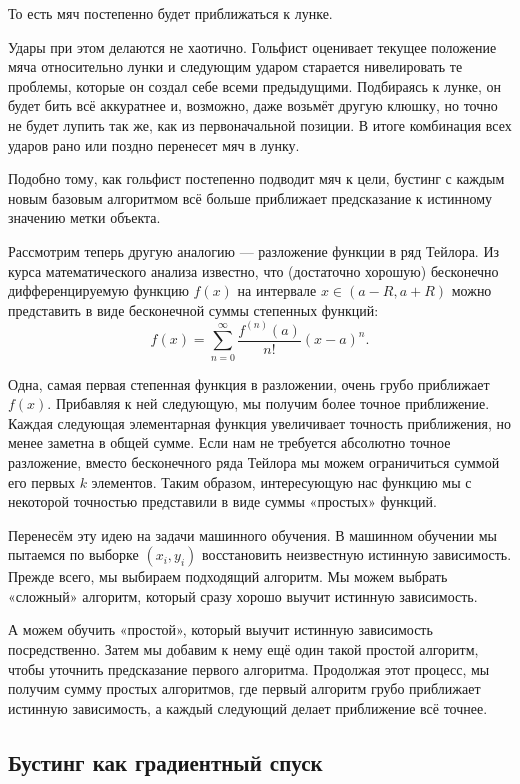 То есть мяч постепенно будет приближаться к лунке.

Удары при этом делаются не хаотично.
Гольфист оценивает текущее положение мяча относительно лунки и следующим ударом старается нивелировать те проблемы,
которые он создал себе всеми предыдущими.
Подбираясь к лунке, он будет бить всё аккуратнее и, возможно, даже возьмёт другую клюшку, но точно не будет лупить
так же, как из первоначальной позиции.
В итоге комбинация всех ударов рано или поздно перенесет мяч в лунку.

Подобно тому, как гольфист постепенно подводит мяч к цели, бустинг с каждым новым базовым алгоритмом всё больше
приближает предсказание к истинному значению метки объекта.

Рассмотрим теперь другую аналогию — разложение функции в ряд Тейлора.
Из курса математического анализа известно, что (достаточно хорошую) бесконечно дифференцируемую функцию $f(x)$ на
интервале $x \in (a-R, a+R)$ можно представить в виде бесконечной суммы степенных функций:
\[ f(x) = \sum_{n=0}^{\infty} \frac{f^{(n)}(a)}{n!} (x-a)^n. \]

Одна, самая первая степенная функция в разложении, очень грубо приближает $f(x)$.
Прибавляя к ней следующую, мы получим более точное приближение.
Каждая следующая элементарная функция увеличивает точность приближения, но менее заметна в общей сумме.
Если нам не требуется абсолютно точное разложение, вместо бесконечного ряда Тейлора мы можем ограничиться суммой его
первых $k$ элементов.
Таким образом, интересующую нас функцию мы с некоторой точностью представили в виде суммы «простых» функций.

Перенесём эту идею на задачи машинного обучения.
В машинном обучении мы пытаемся по выборке $(x_i,y_i)$ восстановить неизвестную истинную зависимость.
Прежде всего, мы выбираем подходящий алгоритм.
Мы можем выбрать «сложный» алгоритм, который сразу хорошо выучит истинную зависимость.

А можем обучить «простой», который выучит истинную зависимость посредственно.
Затем мы добавим к нему ещё один такой простой алгоритм, чтобы уточнить предсказание первого алгоритма.
Продолжая этот процесс, мы получим сумму простых алгоритмов, где первый алгоритм грубо приближает истинную
зависимость, а каждый следующий делает приближение всё точнее.

\subsection{Бустинг как градиентный спуск}


